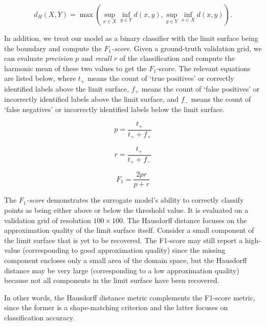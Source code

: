 \begin{equation}
d_H(X,Y) = \max \left( \sup_{x \in X} \inf_{y \in Y}
d(x,y),\sup_{y \in Y} \inf_{x \in X} d(x,y)\right).
\end{equation}

In addition, we treat our model as a binary classifier with the limit surface being the boundary and compute the \emph{$F_1$-score}.
%
Given a ground-truth validation grid, we can evaluate \emph{precision} $p$ and \emph{recall} $r$ of the classification and compute the harmonic mean of these two values to get the $F_1$-score.
%
The relevant equations are listed below, where $t_+$ means the count of `true positives' or correctly identified labels above the limit surface, $f_+$ means the count of `false positives' or incorrectly identified labels above the limit surface, and $f_-$ means the count of `false negatives' or incorrectly identified labels below the limit surface.

\begin{equation}
p = \frac{t_+}{t_+ + f_+}
\end{equation}

\begin{equation}
r = \frac{t_+}{t_+ + f_-}
\end{equation}

\begin{equation}
F_1 = \frac{2pr}{p+r}
\end{equation}


The \emph{$F_1$-score} demonstrates the surrogate model's ability to correctly classify points as being either above or below the threshold value.
%
It is evaluated on a validation grid of resolution $100\times100$.
%
The Hausdorff distance focuses on the approximation quality of the limit surface itself.
%
Consider a small component of the limit surface that is yet to be recovered.
%
The F1-score may still report a high-value (corresponding to good approximation quality) since the missing component encloses only a small area of the domain space, but the Hausdorff distance may be very large (corresponding to a low approximation quality) because not all components in the limit surface have been recovered.

In other words, the Hausdorff distance metric complements the F1-score metric, since the former is a shape-matching criterion and the latter focuses on classification accuracy.
%

